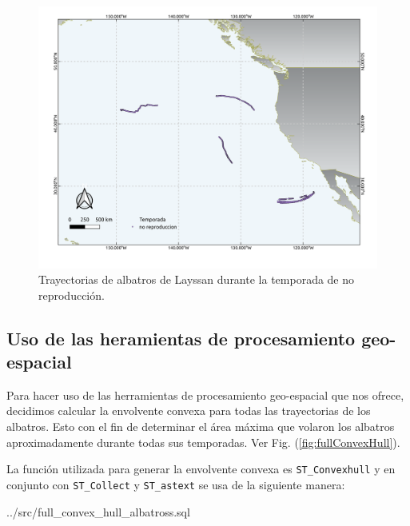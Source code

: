 \begin{figure}[h]
    \centering
    \includegraphics[scale=0.60]{figures/seasonsNoReproduccion.png}
    \caption{Trayectorias de albatros de Layssan durante la temporada de no
    reproducción.}
    \label{fig:NoReproduccion}
\end{figure}

\clearpage
\subsection{Uso de las heramientas de procesamiento geo-espacial}

Para hacer uso de las herramientas de procesamiento geo-espacial que nos ofrece,
decidimos calcular la envolvente convexa para todas las trayectorias de los
albatros. Esto con el fin de determinar el área máxima que volaron los albatros
aproximadamente durante todas sus temporadas. Ver Fig. (\ref{fig:fullConvexHull}).

La función utilizada para generar la envolvente convexa es
\texttt{ST\_Convexhull} y en conjunto con \texttt{ST\_Collect} y
\texttt{ST\_astext} se usa de la siguiente manera:

 {../src/full_convex_hull_albatross.sql}

